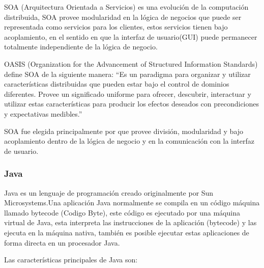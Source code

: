SOA \cite{soa} (Arquitectura Orientada a Servicios) es una evolución de la computación distribuida, SOA provee modularidad en la lógica de negocios que puede ser representada como servicios para los clientes, estos servicios tienen bajo acoplamiento, en el sentido en que la interfaz de usuario(GUI) puede permanecer totalmente independiente de la lógica de negocio.

OASIS (Organization for the Advancement of Structured Information Standards) define SOA de la siguiente manera: ``Es un paradigma para organizar y utilizar características distribuidas que pueden estar bajo el control de dominios diferentes. Provee un significado uniforme para ofrecer, descubrir, interactuar y utilizar estas características para producir los efectos deseados con precondiciones y expectativas medibles.'' \cite{oasis_soa}

SOA fue elegida principalmente por que provee división, modularidad y bajo acoplamiento dentro de la lógica de negocio y en la comunicación con la interfaz de usuario.


\subsubsection{Java}
\label{tec:java}

Java \cite{java} es un lenguaje de programación creado originalmente por Sun Microsystems.\newline Una aplicación Java normalmente se compila en un código máquina llamado bytecode (Codigo Byte), este código es ejecutado por una máquina virtual de Java, esta interpreta las instrucciones de la aplicación (bytecode) y las ejecuta en la máquina nativa, también es posible ejecutar estas aplicaciones de forma directa en un procesador Java.

Las características principales de Java \cite{java_caracteristicas} son:

